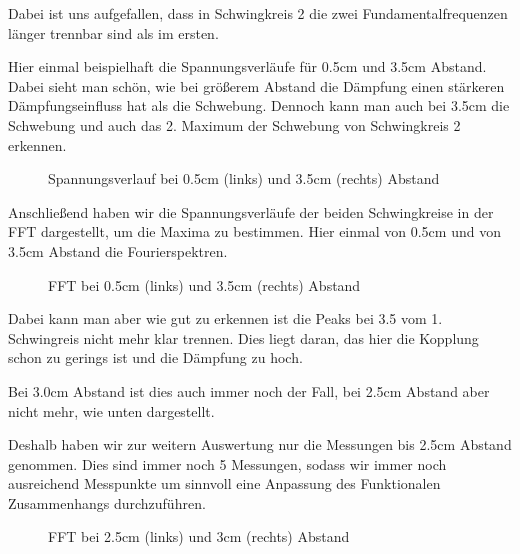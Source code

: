 \documentclass[twoside]{protokoll}
\begin{document}
Dabei ist uns aufgefallen, dass in Schwingkreis 2 die zwei Fundamentalfrequenzen länger trennbar sind als im ersten.  

Hier einmal beispielhaft die Spannungsverläufe für 0.5cm und 3.5cm Abstand.
Dabei sieht man schön, wie bei größerem Abstand die Dämpfung einen stärkeren Dämpfungseinfluss hat als die Schwebung.
Dennoch kann man auch bei 3.5cm die Schwebung und auch das 2. Maximum der Schwebung von Schwingkreis 2 erkennen.
\begin{figure}[H]
    \centering
    \caption{Spannungsverlauf bei 0.5cm (links) und 3.5cm (rechts) Abstand}
\end{figure}

Anschließend haben wir die Spannungsverläufe der beiden Schwingkreise in der FFT dargestellt, um die Maxima zu bestimmen.
Hier einmal von 0.5cm und von 3.5cm Abstand die Fourierspektren.
\begin{figure}[H]
    \centering
    \caption{FFT bei 0.5cm (links) und 3.5cm (rechts) Abstand}
\end{figure}

Dabei kann man aber wie gut zu erkennen ist die Peaks bei 3.5 vom 1. Schwingreis nicht mehr klar trennen.
Dies liegt daran, das hier die Kopplung schon zu gerings ist und die Dämpfung zu hoch.

Bei 3.0cm Abstand ist dies auch immer noch der Fall, bei 2.5cm Abstand aber nicht mehr, wie unten dargestellt.

Deshalb haben wir zur weitern Auswertung nur die Messungen bis 2.5cm Abstand genommen.
Dies sind immer noch 5 Messungen, sodass wir immer noch ausreichend Messpunkte um sinnvoll eine Anpassung des Funktionalen Zusammenhangs durchzuführen.
\begin{figure}[H]
    \centering
    \caption{FFT bei 2.5cm (links) und 3cm (rechts) Abstand}
\end{figure}
 
\end{document}
